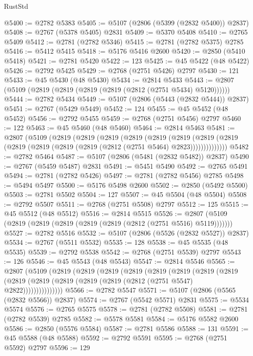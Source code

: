 \begin{lexlean}{RustStd}
\begin{coremodule}
@5400 := @2782 @5383
@5405 := @5107 (@2806 (@5399 (@2832 @5400)) @2837)
@5408 := @2767 (@5378 @5405) @2831
@5409 := @5370 @5408
@5410 := @2765 @5409
@5412 := @2781 (@2782 @5346)
@5415 := @2781 (@2782 @5375) @2785
@5416 := @5412 @5415
@5418 := @5176 @5416 @2600
@5420 := @2850 (@5410 @5418)
@5421 := @2781 @5420
@5422 := 123
@5425 := @45 @5422 (@48 @5422)
@5426 := @2792 @5425
@5429 := @2768 (@2751 @5426) @2797
@5430 := 121
@5433 := @45 @5430 (@48 @5430)
@5434 := @2814 @5433
@5443 := @2807 (@5109 (@2819 (@2819 (@2819 (@2819 (@2812 (@2751 @5434) @5120))))))
@5444 := @2782 @5434
@5449 := @5107 (@2806 (@5443 (@2832 @5444)) @2837)
@5451 := @2767 (@5429 @5449)
@5452 := 124
@5455 := @45 @5452 (@48 @5452)
@5456 := @2792 @5455
@5459 := @2768 (@2751 @5456) @2797
@5460 := 122
@5463 := @45 @5460 (@48 @5460)
@5464 := @2814 @5463
@5481 := @2807
    (@5109
      (@2819
        (@2819
          (@2819
            (@2819
              (@2819
                (@2819
                  (@2819 (@2819 (@2819 (@2819 (@2819 (@2819 (@2812 (@2751 @5464) @2823))))))))))))))
@5482 := @2782 @5464
@5487 := @5107 (@2806 (@5481 (@2832 @5482)) @2837)
@5490 := @2767 (@5459 @5487) @2831
@5491 := @5451 @5490
@5492 := @2765 @5491
@5494 := @2781 (@2782 @5426)
@5497 := @2781 (@2782 @5456) @2785
@5498 := @5494 @5497
@5500 := @5176 @5498 @2600
@5502 := @2850 (@5492 @5500)
@5503 := @2781 @5502
@5504 := 127
@5507 := @45 @5504 (@48 @5504)
@5508 := @2792 @5507
@5511 := @2768 (@2751 @5508) @2797
@5512 := 125
@5515 := @45 @5512 (@48 @5512)
@5516 := @2814 @5515
@5526 := @2807 (@5109 (@2819 (@2819 (@2819 (@2819 (@2819 (@2812 (@2751 @5516) @5119)))))))
@5527 := @2782 @5516
@5532 := @5107 (@2806 (@5526 (@2832 @5527)) @2837)
@5534 := @2767 (@5511 @5532)
@5535 := 128
@5538 := @45 @5535 (@48 @5535)
@5539 := @2792 @5538
@5542 := @2768 (@2751 @5539) @2797
@5543 := 126
@5546 := @45 @5543 (@48 @5543)
@5547 := @2814 @5546
@5565 := @2807
    (@5109
      (@2819
        (@2819
          (@2819
            (@2819
              (@2819
                (@2819
                  (@2819
                    (@2819
                      (@2819 (@2819 (@2819 (@2819 (@2819 (@2812 (@2751 @5547) @2822)))))))))))))))
@5566 := @2782 @5547
@5571 := @5107 (@2806 (@5565 (@2832 @5566)) @2837)
@5574 := @2767 (@5542 @5571) @2831
@5575 := @5534 @5574
@5576 := @2765 @5575
@5578 := @2781 (@2782 @5508)
@5581 := @2781 (@2782 @5539) @2785
@5582 := @5578 @5581
@5584 := @5176 @5582 @2600
@5586 := @2850 (@5576 @5584)
@5587 := @2781 @5586
@5588 := 131
@5591 := @45 @5588 (@48 @5588)
@5592 := @2792 @5591
@5595 := @2768 (@2751 @5592) @2797
@5596 := 129

\end{coremodule}
\end{lexlean}
